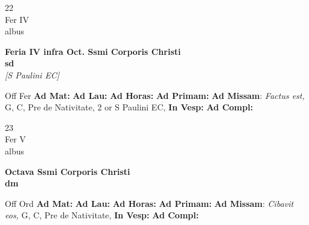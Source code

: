 \documentclass[10pt, openany]{book}
\begin{document}
        \begin{center}
            \begin{minipage}{3.5in}
                \vspace{2em}
                \begin{minipage}{0.5in}
                    {\Huge 22} \\
                    {\normalsize Fer IV} \\
                    {\normalsize albus}
                \end{minipage}
                \begin{minipage}{3.0in}
                    \textbf{ \large Feria IV infra Oct. Ssmi Corporis Christi \\
                    \textnormal{\normalsize sd}} \\ \textit{[S Paulini EC]} \\ 
                \end{minipage}
                \begin{justify}Off Fer
                    \textbf{Ad Mat: }
                    \textbf{Ad Lau: }
                    \textbf{Ad Horas: }
                    \textbf{Ad Primam: }\textbf{Ad Missam}: \textit{Factus est,} G, C, Pre de Nativitate, 2 or S Paulini EC,  
                    \textbf{In Vesp: }
                    \textbf{Ad Compl: }
                \end{justify}
            \end{minipage}
        \end{center}
    
        \begin{center}
            \begin{minipage}{3.5in}
                \vspace{2em}
                \begin{minipage}{0.5in}
                    {\Huge 23} \\
                    {\normalsize Fer V} \\
                    {\normalsize albus}
                \end{minipage}
                \begin{minipage}{3.0in}
                    \textbf{ \large Octava Ssmi Corporis Christi \\
                    \textnormal{\normalsize dm}} \\ 
                \end{minipage}
                \begin{justify}Off Ord
                    \textbf{Ad Mat: }
                    \textbf{Ad Lau: }
                    \textbf{Ad Horas: }
                    \textbf{Ad Primam: }\textbf{Ad Missam}: \textit{Cibavit eos,} G, C, Pre de Nativitate,  
                    \textbf{In Vesp: }
                    \textbf{Ad Compl: }
                \end{justify}
            \end{minipage}
        \end{center}
    
\end{document}
